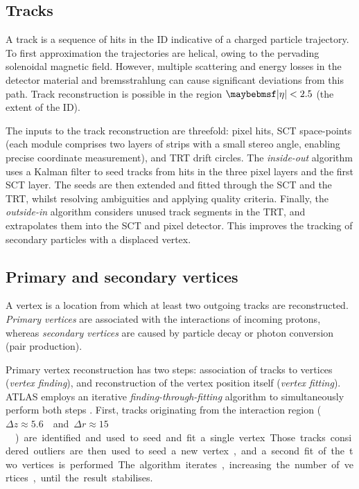 
\subsection{Tracks}
\label{sec:objects:tracks}

A track is a sequence of hits in the \ac{ID} indicative of a charged particle trajectory. 
To first approximation the trajectories are helical, owing to the pervading solenoidal 
magnetic field. However, multiple scattering and energy losses in the detector material 
and bremsstrahlung can cause significant deviations from this path. Track reconstruction 
is possible in the region $\mods{\eta} < 2.5$ (the extent of the \ac{ID}).

The inputs to the track reconstruction are threefold: pixel hits, \acs{SCT} space-points 
(each module comprises two layers of strips with a small stereo angle, enabling precise 
coordinate measurement), and \acs{TRT} drift circles. The \textit{inside-out} algorithm 
\cite{Tracking,ATLAS:ExpectPerf} uses a Kalman filter to seed tracks from hits in the 
three pixel layers and the first \acs{SCT} layer. The seeds are then extended and fitted 
through the \acs{SCT} and the \acs{TRT}, whilst resolving ambiguities and applying 
quality criteria. Finally, the \textit{outside-in} algorithm \cite{Tracking} considers 
unused track segments in the \acs{TRT}, and extrapolates them into the \acs{SCT} and 
pixel detector. This improves the tracking of secondary particles with a displaced vertex.



\subsection{Primary and secondary vertices}
\label{sec:objects:vertices}

A vertex is a location from which at least two outgoing tracks are reconstructed. 
\textit{Primary vertices} are associated with the interactions of incoming protons, 
whereas \textit{secondary vertices} are caused by particle decay or photon conversion
(\epluseminus pair production).

Primary vertex reconstruction has two steps: association of tracks to vertices 
(\textit{vertex finding}), and reconstruction of the vertex position itself 
(\textit{vertex fitting}). ATLAS employs an iterative \textit{finding-through-fitting} 
algorithm to simultaneously perform both steps \cite{PrimVertexFinding,AllVertexFinding}.
First, tracks originating from the interaction region 
(\unit{$\Delta z \approx 5.6$}{\centi\metre} and 
\unit{$\Delta r \approx 15$}{\micro\metre}) are identified and used to seed and fit a 
single vertex. Those tracks considered outliers are then used to seed a new vertex, and a 
second fit of the two vertices is performed. The algorithm iterates, increasing the 
number of vertices, until the result stabilises.

